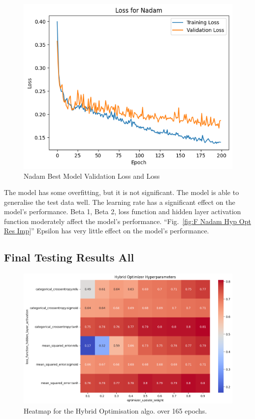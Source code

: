\documentclass[conference]{IEEEtran}
\begin{document}
\begin{figure}[htbp]
\centerline{\includegraphics[width=0.9\columnwidth]{F Nadam Loss Graph.png}}
\caption{Nadam Best Model Validation Loss and Loss}
\label{fig:F Nadam Loss Graph}
\end{figure}

\FloatBarrier

The model has some overfitting, but it is not significant. The model is able to generalise the test data well.
The learning rate has a significant effect on the model's performance.
Beta 1, Beta 2, loss function and hidden layer activation function moderately affect the model's performance. ``Fig.~\ref{fig:F Nadam Hyp Opt Res Imp}''
Epsilon has very little effect on the model's performance. \cite{b2}

\newpage

\subsection{Final Testing Results All}

\begin{figure}[htbp]
\centerline{\includegraphics[width=0.9\columnwidth]{F HO GS HM ouw loss ha.png}}
\caption{Heatmap for the Hybrid Optimisation algo. over 165 epochs.}
\label{fig:F HO GS HM ouw loss ha}
\end{figure}
\end{document}
